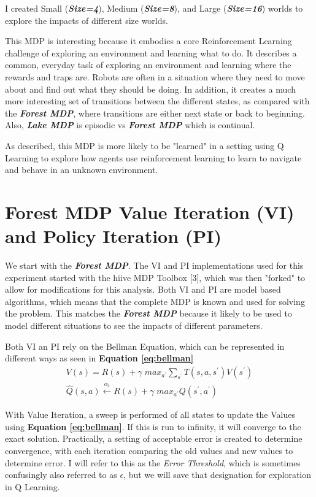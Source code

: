 \documentclass[letterpaper]{article} %
\begin{document}
I created Small (\textbf{\emph{Size=4}}), Medium (\textbf{\emph{Size=8}}), and Large (\textbf{\emph{Size=16}}) worlds to explore the impacts of different size worlds.  

This MDP is interesting because it embodies a core Reinforcement Learning challenge of exploring an environment and learning what to do.  It describes a common, everyday task of exploring an environment and learning where the rewards and traps are.  Robots are often in a situation where they need to move about and find out what they should be doing.  In addition, it creates a much more interesting set of transitions between the different states, as compared with the \textbf{\emph{Forest MDP}}, where transitions are either next state or back to beginning.  Also, \textbf{\emph{Lake MDP}} is episodic vs  \textbf{\emph{Forest MDP}} which is continual.

As described, this MDP is more likely to be "learned" in a setting using Q Learning to explore how agents use reinforcement learning to learn to navigate and behave in an unknown environment.

\section{Forest MDP Value Iteration (VI) and Policy Iteration (PI)}
We start with the \textbf{\emph{Forest MDP}}.   The VI and PI implementations used for this experiment started with the hiive MDP Toolbox [3], which was then "forked" to allow for modifications for this analysis.  Both VI and PI are model based algorithms, which means that the complete MDP is known and used for solving the problem.  This matches the \textbf{\emph{Forest MDP}} because it likely to be used to model different situations to see the impacts of different parameters.   

Both VI an PI rely on the Bellman Equation, which can be represented in different ways as seen in  \textbf{Equation \ref{eq:bellman}} 
\begin{equation} 
\label{eq:bellman}
\begin{gathered}
V(s) = R(s) + \gamma \; max_{a^\prime}  \sum_{s^\prime} T(s,a,s^\prime) V(s^\prime)\\
\hat{Q}(s,a) \xleftarrow{\alpha_t} R(s) + \gamma \;  max_{a^\prime} Q(s^\prime, a^\prime)
\end{gathered}
\end{equation}

With Value Iteration, a sweep is performed of all states to update the Values using \textbf{Equation \ref{eq:bellman}}.  If this is run to infinity, it will converge to the exact solution.  Practically, a setting of acceptable error is created to determine convergence, with each iteration comparing the old values and new values to determine error.  I will refer to this as the \emph{Error Threshold}, which is sometimes confusingly also referred to as $\epsilon$, but we will save that designation for exploration in Q Learning. 
\end{document}
